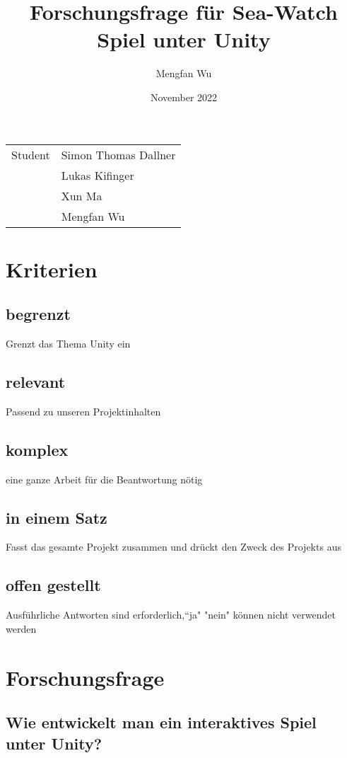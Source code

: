 \documentclass{article}
\title{Forschungsfrage für Sea-Watch Spiel unter Unity
}
\author{Mengfan Wu}
\date{November 2022}
\begin{document}
\maketitle

\noindent\begin{tabular}{@{}ll}
    Student &  Simon Thomas Dallner \\& Lukas Kifinger \\&  Xun Ma \\& Mengfan Wu
     
\end{tabular}

\section{Kriterien}

\subsection{begrenzt}
Grenzt das Thema Unity ein
\subsection{relevant}
Passend zu unseren Projektinhalten

\subsection{komplex}
eine ganze Arbeit für die Beantwortung nötig

\subsection{in einem Satz}
Fasst das gesamte Projekt zusammen und drückt den Zweck des Projekts aus

\subsection{offen gestellt}
Ausführliche Antworten sind erforderlich,“ja" "nein"  können nicht verwendet werden


\section{Forschungsfrage}
\subsection{Wie entwickelt man ein interaktives Spiel unter Unity?}
\end{document}
